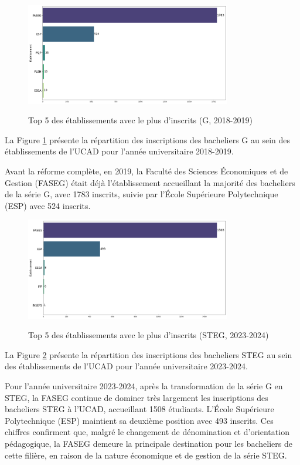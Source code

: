 \begin{figure}[ht]
\centering
\caption{Top 5 des établissements avec le plus d'inscrits (G, 2018-2019)}
\includegraphics[width=0.8\textwidth]{figure/etab_G_2019.png}
\label{fig:etab_g_2019}
\end{figure}

La Figure \ref{fig:etab_g_2019} présente la répartition des inscriptions des bacheliers G au sein des établissements de l'UCAD pour l'année universitaire 2018-2019.

Avant la réforme complète, en 2019, la Faculté des Sciences Économiques et de Gestion (FASEG) était déjà l'établissement accueillant la majorité des bacheliers de la série G, avec 1783 inscrits, suivie par l'École Supérieure Polytechnique (ESP) avec 524 inscrits. 

\begin{figure}[ht]
\centering
\caption{Top 5 des établissements avec le plus d'inscrits (STEG, 2023-2024)}
\includegraphics[width=0.8\textwidth]{figure/etab_STEG_2024.png}
\label{fig:etab_steg_2024}
\end{figure}

La Figure \ref{fig:etab_steg_2024} présente la répartition des inscriptions des bacheliers STEG au sein des établissements de l'UCAD pour l'année universitaire 2023-2024.

Pour l'année universitaire 2023-2024, après la transformation de la série G en STEG, la FASEG continue de dominer très largement les inscriptions des bacheliers STEG à l'UCAD, accueillant 1508 étudiants. 
L'École Supérieure Polytechnique (ESP) maintient sa deuxième position avec 493 inscrits. Ces chiffres confirment que, malgré le changement de dénomination et d'orientation pédagogique, la FASEG demeure la principale destination pour les bacheliers de cette filière, en raison de la nature économique et de gestion de la série STEG. 

